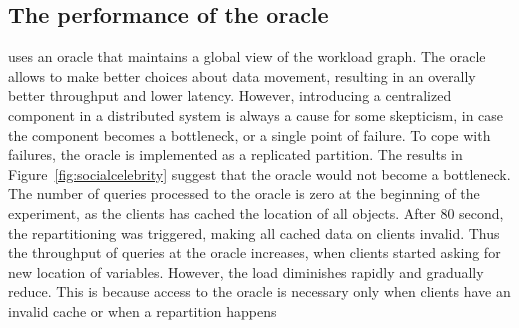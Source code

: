 
\subsection{The performance of the oracle}

\dynastar  uses an oracle that maintains a global view of the workload graph. The oracle allows
\dynastar to make better choices about data movement, resulting in an overally
better throughput and lower latency. However, introducing a centralized
component in a distributed system is always a cause for some skepticism,
in case the component becomes a bottleneck, or a single point of failure. 
To cope with failures, the oracle is implemented as a replicated partition. 
The results in Figure~\ref{fig:socialcelebrity} suggest that the oracle would not become a bottleneck.
The number of queries processed to the oracle is zero at the 
beginning of the experiment, as the clients has cached the location of all objects.
After 80 second, the repartitioning was triggered, making all cached data on clients invalid.
Thus the throughput of queries at the oracle increases, when clients started asking for new location of variables.
However, the load diminishes rapidly and gradually reduce. This is because access to the oracle is necessary only
when clients have an invalid cache or when a repartition happens


